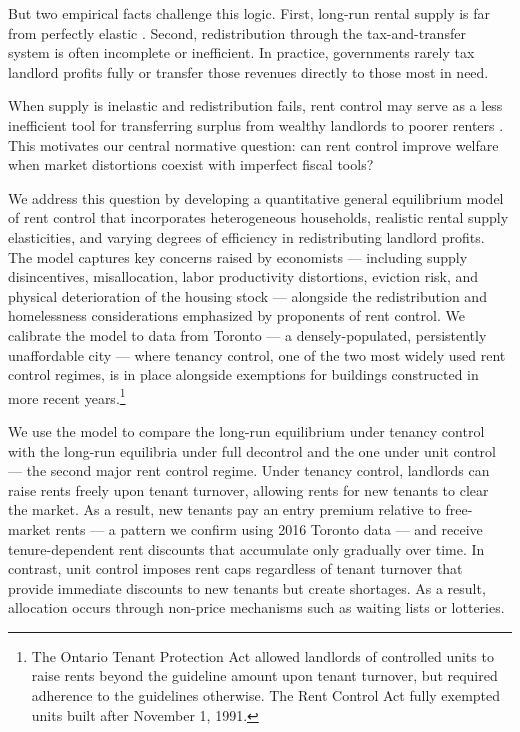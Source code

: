 \documentclass[parskip=full]{article}
\begin{document}
But two empirical facts challenge this logic. First, long-run rental supply is far from perfectly elastic \citep{orr-1968,cy-1994,susin-2002,fack-2006,sy-2020,rs-2023}. Second, redistribution through the tax-and-transfer system is often incomplete or inefficient. In practice, governments rarely tax landlord profits fully or transfer those revenues directly to those most in need.

When supply is inelastic and redistribution fails, rent control may serve as a less inefficient tool for transferring surplus from wealthy landlords to poorer renters \citep{gyourko1989,arnott-1995}. This motivates our central normative question: can rent control improve welfare when market distortions coexist with imperfect fiscal tools?

We address this question by developing a quantitative general equilibrium model of rent control that incorporates heterogeneous households, realistic rental supply elasticities, and varying degrees of efficiency in redistributing landlord profits. The model captures key concerns raised by economists — including supply disincentives, misallocation, labor productivity distortions, eviction risk, and physical deterioration of the housing stock — alongside the redistribution and homelessness considerations emphasized by proponents of rent control. We calibrate the model to data from Toronto — a densely-populated, persistently unaffordable city — where tenancy control, one of the two most widely used rent control regimes, is in place alongside exemptions for buildings constructed in more recent years.\footnote{The Ontario Tenant Protection Act allowed landlords of controlled units to raise rents beyond the guideline amount upon tenant turnover, but required adherence to the guidelines otherwise. The Rent Control Act fully exempted units built after November 1, 1991.} 

We use the model to compare the long-run equilibrium under tenancy control with the long-run equilibria under full decontrol and the one under unit control — the second major rent control regime. Under tenancy control, landlords can raise rents freely upon tenant turnover, allowing rents for new tenants to clear the market. As a result, new tenants pay an entry premium relative to free-market rents — a pattern we confirm using 2016 Toronto data — and receive tenure-dependent rent discounts that accumulate only gradually over time. In contrast, unit control imposes rent caps regardless of tenant turnover that provide immediate discounts to new tenants but create shortages. As a result, allocation occurs through non-price mechanisms such as waiting lists or lotteries.
\end{document}
